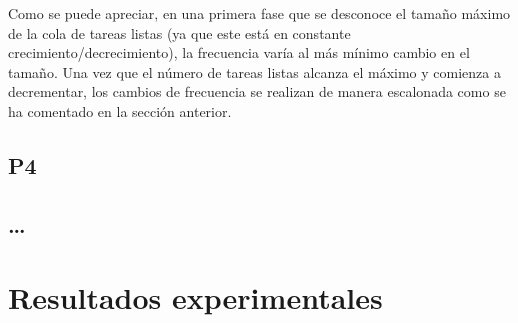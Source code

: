 Como se puede apreciar, en una primera fase que se desconoce el
tamaño máximo de la cola de tareas listas (ya que este está en constante
crecimiento/decrecimiento), la frecuencia varía al más mínimo cambio en el
tamaño. Una vez que el número de tareas listas alcanza el máximo y comienza
a decrementar, los cambios de frecuencia se realizan de manera escalonada
como se ha comentado en la sección anterior.






\subsection{P4}

\subsection{\ldots}


\section{Resultados experimentales}



